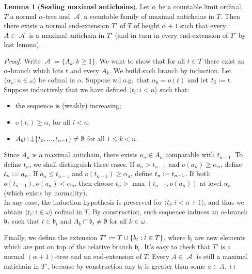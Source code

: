 \documentclass[12pt,a4paper]{report}
\theoremstyle{definition}
\newtheorem{lemma}[theorem]{Lemma}
\theoremstyle{num.custom-title}
\DeclareMathOperator{\A}{\mathcal{A}}
\newcommand{\downmapsto}{%
           \mathrel{\raisebox{.1em}{%
							\rotatebox[origin=c]{-90}{$\mapsto$}}}}
\newcommand*{\defeq}{\mathrel{\rlap{%
                     \raisebox{0.3ex}{$\cdot$}}%
                     \raisebox{-0.3ex}{$\cdot$}}%
                     =}
\begin{document}
\begin{lemma}[\textbf{Sealing maximal antichains}]\label{lemma-kill_countable_max_antichains}
Let $\alpha$ be a countable limit ordinal, $T$ a normal $\alpha$-tree and $\A$ a countable family of maximal antichains in $T$. Then there exists a normal end-extension $T'$ of $T$ of height $\alpha+1$ such that every $A \in \A$ is a maximal antichain in $T'$ (and in turn in every end-extension of $T'$ by last lemma).
\begin{proof}
Write $\A = \{A_k : k \geq 1 \}$. We want to show that for all $t \in T$ there exist an $\alpha$-branch which hits $t$ and every $A_k$. We build such branch by induction. Let $\langle \alpha_n : n \in \omega \rangle$ be cofinal in $\alpha$. Suppose w.l.o.g.\ that $\alpha_0 = o(t)$ and let $t_0 \defeq t$. Suppose inductively that we have defined $\langle t_i : i < n \rangle$ such that:
\begin{itemize}
\item the sequence is (weakly) increasing;
\item $o(t_i) \geq \alpha_i$ for all $i<n$;
\item $A_k \cap \downmapsto \{t_0,...,t_{n-1}\} \neq \emptyset$ for all $1 \leq k < n$.
\end{itemize}
Since $A_n$ is a maximal antichain, there exists $a_n \in A_n$ comparable with $t_{n-1}$. To define $t_n$, we shall distinguish three cases. If $a_n > t_{n-1}$ and $o(a_n) \geq \alpha_n$, define $t_n \defeq a_n$. If $a_n \leq t_{n-1}$ and $o(t_{n-1}) \geq \alpha_n$, define $t_n \defeq t_{n-1}$. If both $o(t_{n-1}), o(a_n) < \alpha_n$, then choose $t_n > \max(t_{n-1},o(a_n))$ at level $\alpha_n$ (which exists by normality).\\
In any case, the induction hypothesis is preserved for $\langle t_i : i < n+1 \rangle$, and thus we obtain $\langle t_i : i \in \omega \rangle$ cofinal in $T$. By construction, such sequence induces an $\alpha$-branch $\mathfrak{b}_t$ such that $t \in \mathfrak{b}_t$ and $A_k \cap \mathfrak{b}_t \neq \emptyset$ for all $k \in \omega$.

Finally, we define the extension $T' \defeq T \cup \{ b_t : t \in T\}$, where $b_t$ are new elements which are put on top of the relative branch $\mathfrak{b}_t$. It's easy to check that $T'$ is a normal $(\alpha+1)$-tree and an end-extension of $T$. Every $A \in \A$ is still a maximal antichain in $T'$, because by construction any $b_t$ is greater than some $a \in A$.
\end{proof}
\end{lemma}
\end{document}
